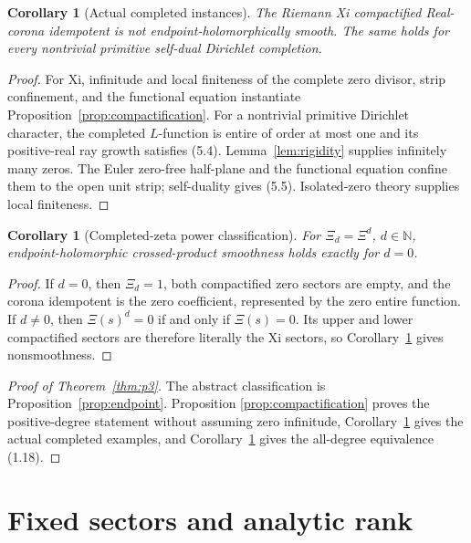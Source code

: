 \documentclass[11pt,reqno]{amsart}
\newtheorem{corollary}[theorem]{Corollary}
\newcommand{\N}{\mathbb N}
\begin{document}
\begin{corollary}[Actual completed instances]\label{cor:actual}
The Riemann Xi compactified Real-corona idempotent is not endpoint-holomorphically smooth.  The same
holds for every nontrivial primitive self-dual Dirichlet completion.
\end{corollary}

\begin{proof}
For Xi, infinitude and local finiteness of the complete zero divisor, strip confinement, and the
functional equation instantiate Proposition~\ref{prop:compactification}.  For a nontrivial
primitive Dirichlet character, the completed $L$-function is entire of order at most one and its
positive-real ray growth satisfies (5.4).  Lemma~\ref{lem:rigidity} supplies infinitely many zeros.
The Euler zero-free half-plane and the functional equation confine them to the open unit strip;
self-duality gives (5.5).  Isolated-zero theory supplies local finiteness.
\end{proof}

\begin{corollary}[Completed-zeta power classification]\label{cor:xipower}
For $\Xi_d=\Xi^d$, $d\in\N$, endpoint-holomorphic crossed-product smoothness holds exactly for
$d=0$.
\end{corollary}

\begin{proof}
If $d=0$, then $\Xi_d=1$, both compactified zero sectors are empty, and the corona idempotent is
the zero coefficient, represented by the zero entire function.  If $d\ne0$, then
$\Xi(s)^d=0$ if and only if $\Xi(s)=0$.  Its upper and lower compactified sectors are therefore
literally the Xi sectors, so Corollary~\ref{cor:actual} gives nonsmoothness.
\end{proof}

\begin{proof}[Proof of Theorem~\ref{thm:p3}]
The abstract classification is Proposition~\ref{prop:endpoint}.  Proposition
\ref{prop:compactification} proves the positive-degree statement without assuming zero infinitude,
Corollary~\ref{cor:actual} gives the actual completed examples, and
Corollary~\ref{cor:xipower} gives the all-degree equivalence (1.18).
\end{proof}

\section{Fixed sectors and analytic rank}\label{sec:p4}
\end{document}
